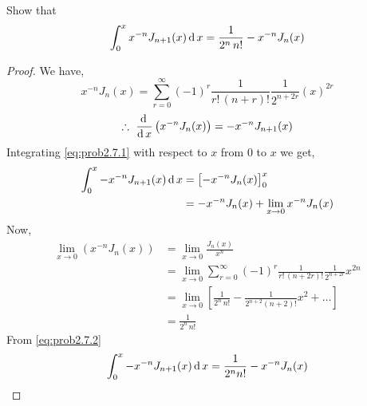 \documentclass[../main-sheet.tex]{subfiles}
\begin{document}
\begin{prob}
    Show that 
    \[
        \int_0^x x^{-n}J_{n+1}(x)\,\mathrm{d}\, x=\frac{1}{2^n\,n!}-x^{-n}J_n(x)
    \]
\end{prob}
\begin{proof}
    We have,
    \[
        x^{-n}J_n(x)=\sum_{r=0}^\infty (-1)^r \frac{1}{r!\, (n+r)!}\frac{1}{2^{n+2r}}(x)^{2r}
    \]
    \begin{equation}
        \therefore\, \,\frac{\mathrm{d}\,}{\mathrm{d}\,x}\left( x^{-n} J_n(x) \right)=-x^{-n} J_{n+1}(x)\label{eq:prob2.7.1}
    \end{equation}
    Integrating \eqref{eq:prob2.7.1} with respect to $ x $ from $ 0 $ to $ x $ we get,
    \begin{align}
        \int_0^x -x^{-n}J_{n+1}(x)\,\mathrm{d}\, x &= \left[-x^{-n} J_{n}(x)\right]_{0}^x\notag\\
        &=-x^{-n} J_n(x)+\lim\limits_{x\rightarrow 0} x^{-n}J_n(x)\label{eq:prob2.7.2}
    \end{align}
    Now,
    \begin{align*}
        \lim\limits_{x\rightarrow 0}\left( x^{-n}J_n(x) \right)&=\lim\limits_{x\rightarrow 0} \frac{J_n(x)}{x^n}\\
        &=\lim\limits_{x\rightarrow 0} \sum_{r=0}^\infty (-1)^r \frac{1}{r!\,(n+2r)!}\frac{1}{2^{n+2r}}x^{2n}\\
        &= \lim\limits_{x\rightarrow 0} \left[ \frac{1}{2^n\,n!}-\frac{1}{2^{n+2}(n+2)!}x^2+\dots \right]\\
        &=\frac{1}{2^n\,n!}
    \end{align*}
    From \eqref{eq:prob2.7.2}
    \[
        \int_0^x -x^{-n}J_{n+1}(x)\,\mathrm{d}\, x =\frac{1}{2^n n!}-x^{-n} J_n(x)
    \]
\end{proof}
\end{document}
